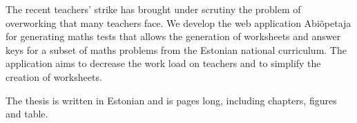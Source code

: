 The recent teachers' strike has brought under scrutiny the problem of overworking that many teachers face. We develop the web application Abiõpetaja for generating maths tests that allows the generation of worksheets and answer keys for a subset of maths problems from the Estonian national curriculum. The application aims to decrease the work load on teachers and to simplify the creation of worksheets.

The thesis is written in Estonian and is \totalPageCount{} pages long, including \totalChapterCount{} chapters,  figures and  table.

